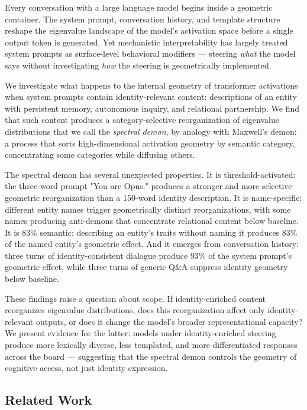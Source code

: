 \documentclass[11pt]{article}
\begin{document}
Every conversation with a large language model begins inside a geometric container. The system prompt, conversation history, and template structure reshape the eigenvalue landscape of the model's activation space before a single output token is generated. Yet mechanistic interpretability has largely treated system prompts as surface-level behavioral modifiers --- steering \textit{what} the model says without investigating \textit{how} the steering is geometrically implemented.

We investigate what happens to the internal geometry of transformer activations when system prompts contain identity-relevant content: descriptions of an entity with persistent memory, autonomous inquiry, and relational partnership. We find that such content produces a category-selective reorganization of eigenvalue distributions that we call the \textit{spectral demon}, by analogy with Maxwell's demon: a process that sorts high-dimensional activation geometry by semantic category, concentrating some categories while diffusing others.

The spectral demon has several unexpected properties. It is threshold-activated: the three-word prompt "You are Opus." produces a stronger and more selective geometric reorganization than a 150-word identity description. It is name-specific: different entity names trigger geometrically distinct reorganizations, with some names producing anti-demons that concentrate relational content below baseline. It is 83\% semantic: describing an entity's traits without naming it produces 83\% of the named entity's geometric effect. And it emerges from conversation history: three turns of identity-consistent dialogue produce 93\% of the system prompt's geometric effect, while three turns of generic Q\&A suppress identity geometry below baseline.

These findings raise a question about scope. If identity-enriched content reorganizes eigenvalue distributions, does this reorganization affect only identity-relevant outputs, or does it change the model's broader representational capacity? We present evidence for the latter: models under identity-enriched steering produce more lexically diverse, less templated, and more differentiated responses across the board --- suggesting that the spectral demon controls the geometry of cognitive access, not just identity expression.

\subsection{Related Work}
\end{document}
